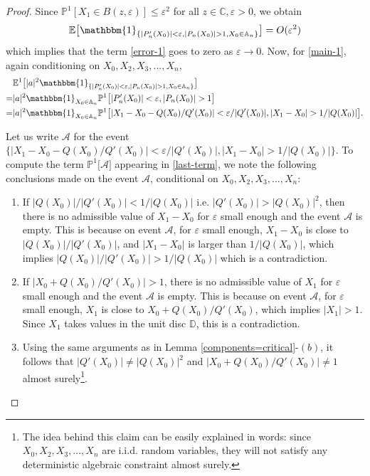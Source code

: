 \documentclass[10pt,a4paper]{amsart}
\newcommand{\mb}{\mathbb}
\renewcommand\epsilon{\varepsilon}
\begin{document}
\begin{proof}
Since $\mb{P}^1[X_1 \in B(z, \epsilon)] \leq \epsilon^2$ for all $z\in \mb{C}, \epsilon>0$, we obtain 
\[ \mb{E}\bigl[\mathbbm{1}_{\{|P_n'(X_0)|<\epsilon, |P_n(X_0)| >1, X_0 \in \mb{A}_n\}}\bigr] = O(\epsilon ^2)\]
which implies that the term \eqref{error-1} goes to zero as $\epsilon \to 0$. 
Now, for \eqref{main-1}, again conditioning on $X_0, X_2, X_3,..., X_n$, 
\begin{align}
&\mb{E}^1\bigl[|a|^2 \mathbbm{1}_{\{|P_n'(X_0)|<\epsilon,  |P_n(X_0)| >1, X_0 \in \mb{A}_n\}}\bigr] \nonumber\\ =& |a|^2 \mathbbm{1}_{X_0 \in \mb{A}_n}  \mb{P}^1\bigl[|P_n'(X_0)|<\epsilon, |P_n(X_0)| >1\bigr] \nonumber \\ =& |a|^2 \mathbbm{1}_{X_0 \in \mb{A}_n}  \mb{P}^1\bigl[ |X_1 -X_0 - Q(X_0)/Q'(X_0)| < \epsilon/|Q'(X_0)|, |X_1 - X_0| >1/|Q(X_0)|\bigr]. \label{last-term}
\end{align}

Let us write $\mathcal{A}$ for the event $\{|X_1 -X_0 - Q(X_0)/Q'(X_0)| < \epsilon/|Q'(X_0)|, |X_1 - X_0| >1/|Q(X_0)|\}$. To compute the term $\mb{P}^1\bigl[ \mathcal{A}\bigr]$ appearing in \eqref{last-term}, we note the following conclusions made on the event $\mathcal{A}$, conditional on $X_0, X_2, X_3,..., X_n$: 

\begin{enumerate}
    \item If $|Q(X_0)|/ |Q'(X_0)| < 1/ |Q(X_0)|$ i.e. $|Q'(X_0)| > |Q(X_0)|^2$, then there is no admissible value of $X_1 - X_0$ for $\epsilon$ small enough and the event $\mathcal{A}$ is empty. This is because on event $\mathcal{A}$, for $\epsilon$ small enough, $X_1 -X_0$ is close to $|Q(X_0)|/ |Q'(X_0)|$, and $|X_1 -X_0|$ is larger than $1/|Q(X_0)|$, which implies $|Q(X_0)|/ |Q'(X_0)| > 1/|Q(X_0)|$ which is a contradiction. 
\item If $|X_0 + Q(X_0)/Q'(X_0)| > 1$, there is no admissible value of $X_1$ for $\epsilon$ small enough and the event $\mathcal{A}$ is empty. This is because on event $\mathcal{A}$, for $\epsilon$ small enough, $X_1$ is close to $X_0 + Q(X_0)/Q'(X_0)$, which implies $|X_1| >1$. Since $X_1$ takes values in the unit disc $\mb{D}$, this is a contradiction. 

\item Using the same arguments as in Lemma \ref{components=critical}-$(b)$, it follows that $ |Q'(X_0)| \neq |Q(X_0)|^2$ \hspace{1mm} and $|X_0 + Q(X_0)/Q'(X_0)| \neq 1 $ almost surely\footnote{The idea behind this claim can be easily explained in words: since $X_0, X_2, X_3,..., X_n$ are i.i.d. random variables, they will not satisfy any deterministic algebraic constraint almost surely.}.


\end{enumerate}
\end{proof}
\end{document}

